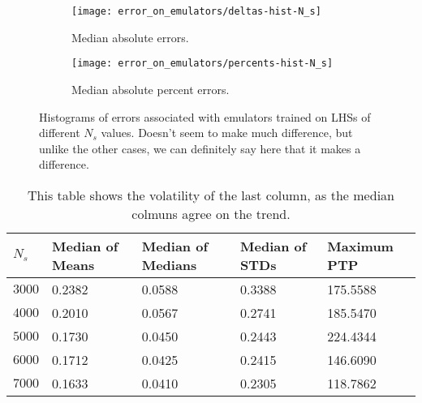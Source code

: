 \begin{figure}[ht!]
    \begin{subfigure}{0.35 \textheight}
    \centering
 		\texttt{[image: error\_on\_emulators/deltas-hist-N\_s]}
 		\caption{Median absolute errors.}
 		\label{fig: Ns_experiment_deltas}
    \end{subfigure}
    \begin{subfigure}{0.35 \textheight}
    \centering
 		\texttt{[image: error\_on\_emulators/percents-hist-N\_s]}
 		\caption{Median absolute percent errors.}
 		\label{fig: Ns_experiment_percerr}
    \end{subfigure}
        \centering
    \caption[Impact of $s^*$ on Accuracy]
    		{Histograms of errors associated with emulators trained on LHSs of
    			different $N_s$ values. Doesn't seem to make much difference,
    			but unlike the other cases, we can definitely say here that it
    			makes a difference.}
    \label{fig: Ns_experiment}
\end{figure}

\begin{table}[ht!]
\centering
\begin{tabular}{l|l|l|l|l}
\hline
$N_s$ & Median of Means & Median of Medians & Median of STDs & Maximum PTP \\ \hline
$3000$ & 0.2382 & 0.0588 & 0.3388 & 175.5588 \\
$4000$ & 0.2010 & 0.0567 & 0.2741 & 185.5470 \\
$5000$ & 0.1730 & 0.0450 & 0.2443 & 224.4344 \\
$6000$ & 0.1712 & 0.0425 & 0.2415 & 146.6090 \\
$7000$ & 0.1633 & 0.0410 & 0.2305 & 118.7862 \\
\end{tabular}
	\cprotect\caption[$N_s$ Experiment: Deltas Statistics]{This table shows
		the volatility of the last column, as the median colmuns agree on the
		trend.}
 \label{tab: Ns_experiment_deltas_stats}
\end{table}


